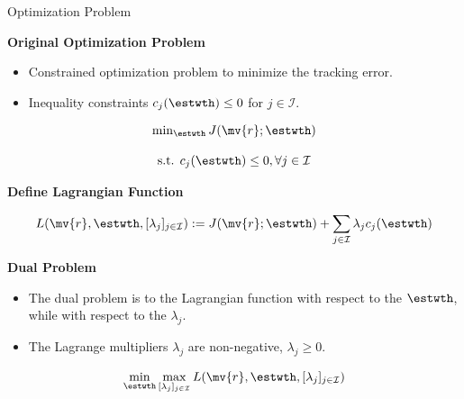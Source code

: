 \documentclass[8pt, aspectratio=169]{beamer}
\newcommand{\ctxt}[2]{\color{#1}{#2}\color{black}}
\begin{document}
\begin{frame}{\insertsubsectionhead}{Optimization Problem}

  \textbf{Original Optimization Problem}

  \begin{itemize}
    \item Constrained optimization problem to minimize the tracking error.
    \item Inequality constraints $c_j(\estwth) \le 0$ for $j\in\mathcal{I}$.
  \end{itemize}

    \begin{equation}\label{eq:opt_problem}
      \begin{matrix}
        \min_{\estwth} J(\mv{r};\estwth)
        \\\ \\
        \text{s.t. } c_{j}(\estwth) 
        \le 
        0
        ,
        \forall j\in\mathcal{I}
      \end{matrix}
    \end{equation}

  {
    \textbf{Define Lagrangian Function}

    \begin{equation}\label{eq:lagrangian}
        L(\mv{r},\estwth,[\lambda_j]_{j\in\mathcal{I}})
        :=
        J(\mv{r};\estwth)
        +
        \sum_{j\in\mathcal{I}} \lambda_j c_j(\estwth)
    \end{equation}
  }

  {
    \textbf{Dual Problem}
    \begin{itemize}
      \item The dual problem is to \ctxt{airforceblue}{minimize } the Lagrangian function with respect to the \ctxt{airforceblue}{NN weights } $\estwth$, while \ctxt{awesome}{maximizing } with respect to the \ctxt{awesome}{Lagrange multipliers } $\lambda_j$.
      \item The Lagrange multipliers $\lambda_j$ are non-negative, \ie $\lambda_j \ge 0$.
    \end{itemize}

    \begin{equation}\label{eq:dual_problem}
      \min_{\estwth}\max_{[\lambda_j]_{j\in\mathcal{I}}} 
      L(\mv{r},\estwth,[\lambda_j]_{j\in\mathcal{I}})
    \end{equation}
  }

\end{frame}
\end{document}
